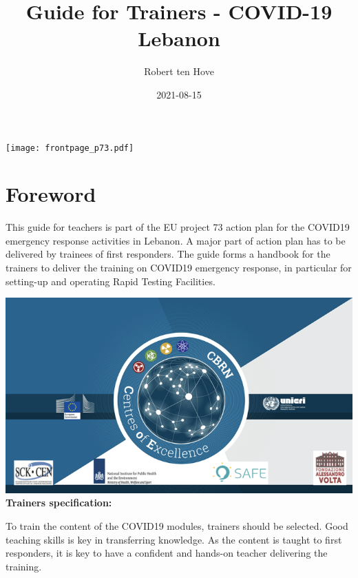 \documentclass[
]{book}
\title{Guide for Trainers - COVID-19 Lebanon}
\author{Robert ten Hove}
\date{2021-08-15}
\let\oldmaketitle\maketitle
\begin{document}
\maketitle

\thispagestyle{empty}
\begin{center}
\texttt{[image: frontpage\_p73.pdf]}
\end{center}

\let\maketitle\oldmaketitle
\maketitle

{
\setcounter{tocdepth}{1}
\tableofcontents
}
\hypertarget{foreword}{%
\chapter{Foreword}\label{foreword}}

This guide for teachers is part of the EU project 73 action plan for the
COVID19 emergency response activities in Lebanon. A major part of action
plan has to be delivered by trainees of first responders. The guide
forms a handbook for the trainers to deliver the training on COVID19
emergency response, in particular for setting-up and operating Rapid Testing Facilities.

\includegraphics{images/CoE.jpeg}\\
\textbf{Trainers specification:}

To train the content of the COVID19 modules, trainers should be
selected. Good teaching skills is key in transferring knowledge. As the
content is taught to first responders, it is key to have a confident and
hands-on teacher delivering the training.
\end{document}
